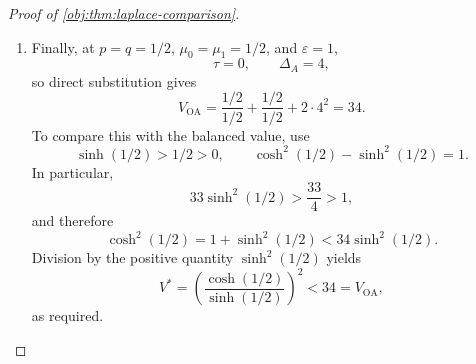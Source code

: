 \documentclass[11pt]{article}
\begin{document}
\begin{proof}[Proof of \cref{obj:thm:laplace-comparison}]
\begin{enumerate}
\item Finally, at \(p=q=1/2\), \(\mu_0=\mu_1=1/2\), and \(\varepsilon=1\),
\[
\tau=0,\qquad \Delta_A=4,
\]
so direct substitution gives
\[
V_{\mathrm{OA}}
=
\frac{1/2}{1/2}+\frac{1/2}{1/2}
+2\cdot4^2
=34.
\]
To compare this with the balanced value, use
\[
\sinh(1/2)>1/2>0,
\qquad
\cosh^2(1/2)-\sinh^2(1/2)=1.
\]
In particular,
\[
33\sinh^2(1/2)>\frac{33}{4}>1,
\]
and therefore
\[
\cosh^2(1/2)
=
1+\sinh^2(1/2)
<
34\sinh^2(1/2).
\]
Division by the positive quantity \(\sinh^2(1/2)\) yields
\[
V^*
=
\left(\frac{\cosh(1/2)}{\sinh(1/2)}\right)^2
<34=V_{\mathrm{OA}},
\]
as required.
\end{enumerate}
\end{proof}
\end{document}
